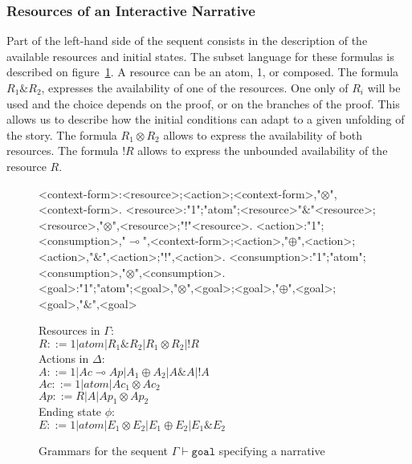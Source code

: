 \documentclass[runningheads,a4paper]{llncs}
\begin{document}
\subsubsection{Resources of an Interactive Narrative}
Part of the left-hand side of the sequent consists in the description of the available resources and initial states. The subset language for these formulas is described on figure~\ref{sequent_grammars}. A resource can be an atom, 1, or composed. The formula $R_{1}\&R_{2}$, expresses the availability of one of the resources. One only of $R_{i}$ will be used and the choice depends on the proof, or on the branches of the proof. This allows us to describe how the initial conditions can adapt to a given unfolding of the story. The formula $R_{1} \otimes R_{2}$ allows to express the availability of both resources. The formula $!R$ allows to express the unbounded availability of the resource $R$.
\begin{figure}
\begin{grammar}
<context-form>:<resource>;<action>;<context-form>,"$\otimes$",<context-form>.
<resource>:"1";"atom";<resource>"$\&$"<resource>;<resource>,"$\otimes$",<resource>;"!"<resource>.
<action>:"1";<consumption>,"$\multimap$",<context-form>;<action>,"$\oplus$",<action>;<action>,"$\&$",<action>;"!",<action>.
<consumption>:"1";"atom";<consumption>,"$\otimes$",<consumption>.\\
<goal>:"1";"atom";<goal>,"$\otimes$",<goal>;<goal>,"$\oplus$",<goal>;<goal>,"$\&$",<goal>
\end{grammar}

Resources in $\Gamma$:\\
$R::= 1| atom | R_{1}\&R_{2} | R_{1} \otimes R_{2} | !R $\\
Actions in $\Delta$:\\
$A::= 1 | Ac \multimap Ap | A_{1} \oplus A_{2} | A\& A | !A$\\
$Ac ::= 1 | atom | Ac_{1} \otimes Ac_{2}$\\
$Ap::= R | A | Ap_{1} \otimes Ap_{2}$\\
Ending state $\phi$:\\
$E::= 1 | atom | E_{1} \otimes E_{2} | E_{1} \oplus E_{2} | E_{1} \& E_{2}$
\caption{Grammars for the sequent $\Gamma\vdash \mathtt{goal}$ specifying a narrative\label{sequent_grammars}}
\end{figure}
\end{document}
